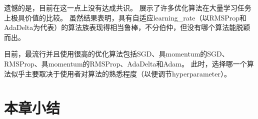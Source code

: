 遗憾的是，目前在这一点上没有达成共识。
\cite{Schaul2014_unittests}展示了许多优化算法在大量学习任务上极具价值的比较。
虽然结果表明，具有自适应\gls{learning_rate}（以RMSProp和AdaDelta为代表）的算法族表现得相当鲁棒，不分伯仲，但没有哪个算法能脱颖而出。

目前，最流行并且使用很高的优化算法包括SGD、具\gls{momentum}的SGD、RMSProp、具\gls{momentum}的RMSProp、AdaDelta和Adam。
此时，选择哪一个算法似乎主要取决于使用者对算法的熟悉程度（以便调节\gls{hyperparameter}）。

\section{本章小结}